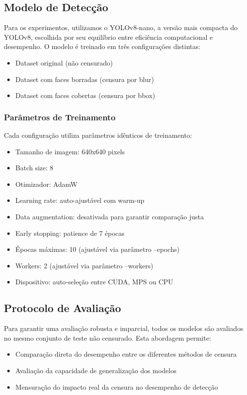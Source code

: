 \documentclass[12pt,a4paper]{article}
\begin{document}
\subsection{Modelo de Detecção}
Para os experimentos, utilizamos o YOLOv8-nano, a versão mais compacta do YOLOv8, escolhida por seu equilíbrio entre eficiência computacional e desempenho. O modelo é treinado em três configurações distintas:

\begin{itemize}
    \item Dataset original (não censurado)
    \item Dataset com faces borradas (censura por blur)
    \item Dataset com faces cobertas (censura por bbox)
\end{itemize}

\subsubsection{Parâmetros de Treinamento}
Cada configuração utiliza parâmetros idênticos de treinamento:
\begin{itemize}
    \item Tamanho de imagem: 640x640 pixels
    \item Batch size: 8
    \item Otimizador: AdamW
    \item Learning rate: auto-ajustável com warm-up
    \item Data augmentation: desativada para garantir comparação justa
    \item Early stopping: patience de 7 épocas
    \item Épocas máximas: 10 (ajustável via parâmetro --epochs)
    \item Workers: 2 (ajustável via parâmetro --workers)
    \item Dispositivo: auto-seleção entre CUDA, MPS ou CPU
\end{itemize}

\subsection{Protocolo de Avaliação}
Para garantir uma avaliação robusta e imparcial, todos os modelos são avaliados no mesmo conjunto de teste não censurado. Esta abordagem permite:

\begin{itemize}
    \item Comparação direta do desempenho entre os diferentes métodos de censura
    \item Avaliação da capacidade de generalização dos modelos
    \item Mensuração do impacto real da censura no desempenho de detecção
\end{itemize}
\end{document}
